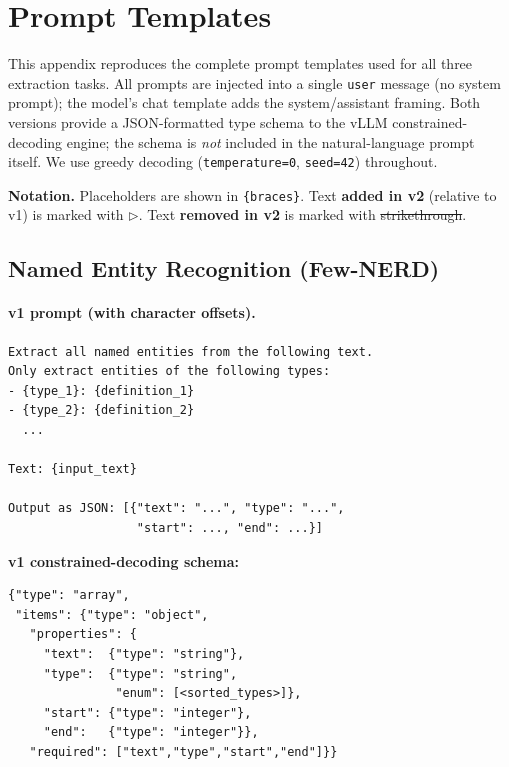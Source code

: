 \lstset{
  basicstyle=\ttfamily\small,
  breaklines=true,
  breakatwhitespace=true,
  columns=fullflexible
}

\section{Prompt Templates}
\label{sec:appendix_prompts}

This appendix reproduces the complete prompt templates used for all three extraction tasks.
All prompts are injected into a single \texttt{user} message (no system prompt); the model's chat template adds the system/assistant framing.
Both versions provide a JSON-formatted type schema to the vLLM constrained-decoding engine; the schema is \emph{not} included in the natural-language prompt itself.
We use greedy decoding (\texttt{temperature=0}, \texttt{seed=42}) throughout.

\medskip\noindent
\textbf{Notation.}
Placeholders are shown in \texttt{\{braces\}}.
Text \textbf{added in v2} (relative to v1) is marked with $\triangleright$.
Text \textbf{removed in v2} is marked with \sout{strikethrough}.

\subsection{Named Entity Recognition (Few-NERD)}

\paragraph{v1 prompt (with character offsets).}

\begin{small}
\begin{lstlisting}
Extract all named entities from the following text.
Only extract entities of the following types:
- {type_1}: {definition_1}
- {type_2}: {definition_2}
  ...

Text: {input_text}

Output as JSON: [{"text": "...", "type": "...",
                  "start": ..., "end": ...}]
\end{lstlisting}
\end{small}

\noindent
\textbf{v1 constrained-decoding schema:}
\begin{small}
\begin{lstlisting}
{"type": "array",
 "items": {"type": "object",
   "properties": {
     "text":  {"type": "string"},
     "type":  {"type": "string",
               "enum": [<sorted_types>]},
     "start": {"type": "integer"},
     "end":   {"type": "integer"}},
   "required": ["text","type","start","end"]}}
\end{lstlisting}
\end{small}

